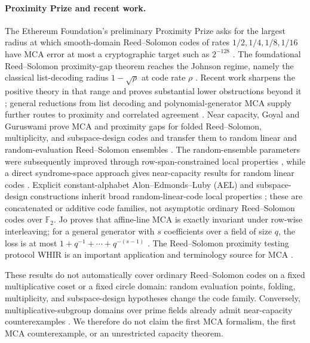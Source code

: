 \documentclass[12pt,a4paper]{amsart}
\numberwithin{equation}{section}
\theoremstyle{remark}
\newcommand{\F}{\mathbb F}
\begin{document}
\paragraph{Proximity Prize and recent work.}
The Ethereum Foundation's preliminary Proximity Prize asks for the
largest radius at which smooth-domain Reed--Solomon codes of rates
\(1/2,1/4,1/8,1/16\) have MCA error at most a cryptographic target such
as \(2^{-128}\) \cite{ProximityPrize,ABF26}.  The foundational
Reed--Solomon proximity-gap theorem reaches the Johnson regime, namely the
classical list-decoding radius \(1-\sqrt{\rho}\) at code rate \(\rho\)
\cite{BCIKS20}.  Recent work sharpens the positive theory in that range
and proves substantial lower obstructions beyond it
\cite{BCHKS25,CS25,Habock25}; general reductions from list decoding and
polynomial-generator MCA supply further routes to proximity and
correlated agreement \cite{GaoCaiXuKan25,BordageChiesaGuanManzur25}.
Near capacity, Goyal and Guruswami prove MCA and proximity gaps for
folded Reed--Solomon, multiplicity, and subspace-design codes and transfer
them to random linear and random-evaluation Reed--Solomon ensembles
\cite{GoyalGuruswami25}.  The random-ensemble parameters were subsequently
improved through row-span-constrained local properties
\cite{GoyalGuruswamiSunWootters26}, while a direct syndrome-space approach
gives near-capacity results for random linear codes
\cite{YuanZhu26}.  Explicit constant-alphabet
Alon--Edmonds--Luby (AEL) and subspace-design
constructions inherit broad random-linear-code local properties
\cite{GoyalGuruswamiHsieh26}; these are concatenated or additive code
families, not asymptotic ordinary Reed--Solomon codes over \(\F_2\).
Jo proves that affine-line MCA is exactly invariant under row-wise
interleaving; for a general generator with \(s\) coefficients over a field
of size \(q\), the loss is at most
\(1+q^{-1}+\cdots+q^{-(s-1)}\) \cite{Jo26}.  The Reed--Solomon proximity
testing protocol WHIR is an important application and terminology source
for MCA \cite{WHIR}.

These results do not automatically cover ordinary Reed--Solomon codes on
a fixed multiplicative coset or a fixed circle domain: random evaluation
points, folding, multiplicity, and subspace-design hypotheses change the
code family.  Conversely, multiplicative-subgroup domains over prime
fields already admit near-capacity counterexamples
\cite{KrachunKazaninHabock26}.  We therefore
do not claim the first MCA formalism, the first MCA counterexample, or an
unrestricted capacity theorem.
\end{document}
